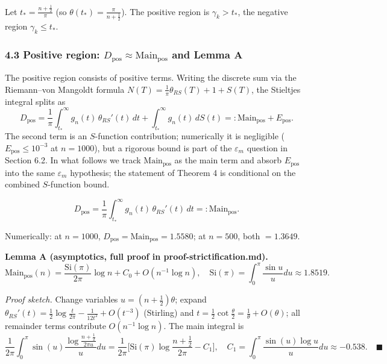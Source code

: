 \documentclass[
]{article}
\begin{document}
Let \(t_* = \tfrac{n+\frac12}{\pi}\) (so
\(\theta(t_*) = \tfrac{\pi}{n+\frac12}\)). The positive region is
\(\gamma_k > t_*\), the negative region \(\gamma_k \le t_*\).

\hypertarget{positive-region-d_mathrmpos-approx-mathrmmain_mathrmpos-and-lemma-a}{%
\subsubsection{\texorpdfstring{4.3 Positive region:
\(D_{\mathrm{pos}} \approx \mathrm{Main}_{\mathrm{pos}}\) and Lemma
A}{4.3 Positive region: D\_\{\textbackslash mathrm\{pos\}\} \textbackslash approx \textbackslash mathrm\{Main\}\_\{\textbackslash mathrm\{pos\}\} and Lemma A}}\label{positive-region-d_mathrmpos-approx-mathrmmain_mathrmpos-and-lemma-a}}

The positive region consists of positive terms. Writing the discrete sum
via the Riemann--von Mangoldt formula
\(N(T) = \frac1\pi\theta_{RS}(T)+1+S(T)\), the Stieltjes integral splits
as
\[D_{\mathrm{pos}} = \frac1\pi\int_{t_*}^{\infty} g_n(t)\,\theta_{RS}'(t)\,dt + \int_{t_*}^{\infty} g_n(t)\,dS(t) =: \mathrm{Main}_{\mathrm{pos}} + E_{\mathrm{pos}}.\]
The second term is an \(S\)-function contribution; numerically it is
negligible (\(E_{\mathrm{pos}} \le 10^{-3}\) at \(n=1000\)), but a
rigorous bound is part of the \(\varepsilon_m\) question in Section 6.2.
In what follows we track \(\mathrm{Main}_{\mathrm{pos}}\) as the main
term and absorb \(E_{\mathrm{pos}}\) into the same \(\varepsilon_m\)
hypothesis; the statement of Theorem 4 is conditional on the combined
\(S\)-function bound.

\[D_{\mathrm{pos}} = \frac1\pi\int_{t_*}^{\infty} g_n(t)\,\theta_{RS}'(t)\,dt =: \mathrm{Main}_{\mathrm{pos}}.\]

Numerically: at \(n=1000\),
\(D_{\mathrm{pos}} = \mathrm{Main}_{\mathrm{pos}} = 1.5580\); at
\(n=500\), both \(= 1.3649\).

\textbf{Lemma A (asymptotics, full proof in proof-strictification.md).}
\[\mathrm{Main}_{\mathrm{pos}}(n) = \frac{\mathrm{Si}(\pi)}{2\pi}\log n + C_0 + O(n^{-1}\log n), \quad \mathrm{Si}(\pi) = \int_0^\pi\frac{\sin u}{u}du \approx 1.8519.\]

\emph{Proof sketch.} Change variables \(u = (n+\tfrac12)\theta\); expand
\(\theta_{RS}'(t) = \tfrac12\log\frac{t}{2\pi} - \frac{1}{12t^2} + O(t^{-3})\)
(Stirling) and
\(t = \tfrac12\cot\frac{\theta}{2} = \frac1\theta + O(\theta)\); all
remainder terms contribute \(O(n^{-1}\log n)\). The main integral is
\[\frac{1}{2\pi}\int_0^\pi \sin(u)\frac{\log\frac{n+\frac12}{2\pi u}}{u}du = \frac{1}{2\pi}\Big[\mathrm{Si}(\pi)\log\frac{n+\frac12}{2\pi} - C_1\Big], \quad C_1 = \int_0^\pi\frac{\sin(u)\log u}{u}du \approx -0.538. \quad \blacksquare\]
\end{document}
